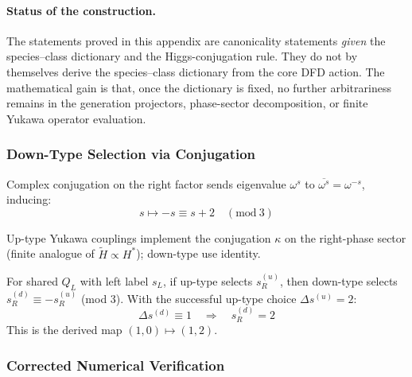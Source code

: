 \paragraph{Status of the construction.}
The statements proved in this appendix are canonicality statements \emph{given} the species--class dictionary and the Higgs-conjugation rule.  They do not by themselves derive the species--class dictionary from the core DFD action.  The mathematical gain is that, once the dictionary is fixed, no further arbitrariness remains in the generation projectors, phase-sector decomposition, or finite Yukawa operator evaluation.

\subsubsection{Down-Type Selection via Conjugation}

\begin{definition}
Complex conjugation on the right factor sends eigenvalue $\omega^{s}$ to 
$\overline{\omega^{s}} = \omega^{-s}$, inducing:
\begin{equation}
\boxed{s \mapsto -s \equiv s+2 \quad (\mathrm{mod}\ 3)}
\end{equation}
\end{definition}

\begin{assumption}\label{assump:higgs-conjugation}
Up-type Yukawa couplings implement the conjugation $\kappa$ on the right-phase 
sector (finite analogue of $\tilde{H} \propto H^{*}$); down-type use identity.
\end{assumption}

\begin{proposition}\label{prop:down-shift}
For shared $Q_L$ with left label $s_L$, if up-type selects $s_R^{(u)}$, then 
down-type selects $s_R^{(d)} \equiv -s_R^{(u)}$ (mod 3). With the successful 
up-type choice $\Delta s^{(u)} = 2$:
\begin{equation}
\boxed{\Delta s^{(d)} \equiv 1 \quad \Rightarrow \quad s_R^{(d)} = 2}
\end{equation}
This is the derived map $(1,0) \mapsto (1,2)$.
\end{proposition}

\subsubsection{Corrected Numerical Verification}

